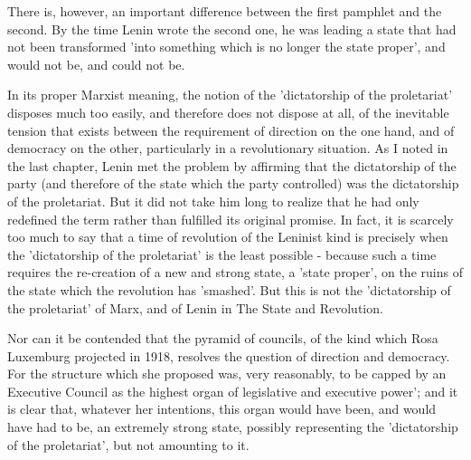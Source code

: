 There is, however, an important difference between the first pamphlet and the second. By the time Lenin wrote the second one, he was leading a state that had not been transformed 'into something which is no longer the state proper', and would not be, and could not be.

In its proper Marxist meaning, the notion of the 'dictatorship of the proletariat' disposes much too easily, and therefore does not dispose at all, of the inevitable tension that exists between the requirement of direction on the one hand, and of democracy on the other, particularly in a revolutionary situation. As I noted in the last chapter, Lenin met the problem by affirming that the dictatorship of the party (and therefore of the state which the party controlled) was the dictatorship of the proletariat. But it did not take him long to realize that he had only redefined the term rather than fulfilled its original promise. In fact, it is scarcely too much to say that a time of revolution of the Leninist kind is precisely when the 'dictatorship of the proletariat' is the least possible - because such a time requires the re-creation of a new and strong state, a 'state proper', on the ruins of the state which the revolution has 'smashed'. But this is not the 'dictatorship of the proletariat' of Marx, and of Lenin in The State and Revolution.

Nor can it be contended that the pyramid of councils, of the kind which Rosa Luxemburg projected in 1918, resolves the question of direction and democracy. For the structure which she proposed was, very reasonably, to be capped by an Executive Council as the highest organ of legislative and executive  power'; and it is clear that, whatever her intentions, this organ would have been, and would have had to be, an extremely strong state, possibly representing the 'dictatorship of the proletariat', but not amounting to it.

